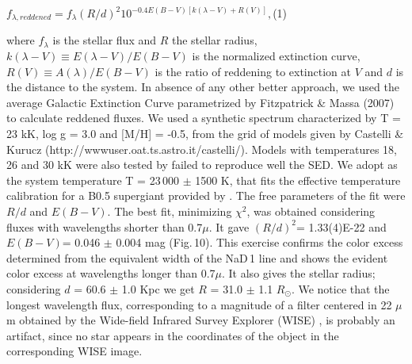 \documentclass[useAMS,usenatbib]{mn2e}
\def\rsun{$R_{\odot}$}
\begin{document}
\begin{small}
$f_{\lambda , reddened}=  f_{\lambda} (R/d)^2  10^{-0.4E(B-V)[k(\lambda -V)+R(V)]}, $\hfill(1)\\
\end{small}
 
\noindent  
where  $f_{\lambda}$ is the stellar flux and $R$ the stellar radius,  $k(\lambda-V) \equiv E(\lambda-V)/E(B-V)$ is the normalized extinction
curve, $R(V) \equiv A(\lambda)/E(B-V)$ is the ratio of reddening to extinction at $V$ and $d$ is the distance to the system. In absence of any other better approach, we used the average Galactic Extinction Curve parametrized by Fitzpatrick \& Massa (2007) to calculate reddened fluxes. 
We used a synthetic spectrum characterized by T = 23 kK, log g = 3.0 and [M/H] = -0.5, from the grid of models given by Castelli \& Kurucz (http://wwwuser.oat.ts.astro.it/castelli/). Models with temperatures 18, 26 and 30 kK were also tested by failed to reproduce well the SED. We adopt as the system temperature T = 23\,000 $\pm$ 1500 K, that
 fits the effective temperature calibration for a B0.5 supergiant provided by \citet{2007A&A...463.1093L}.
The free parameters of the fit were $R/d$ and $E(B-V)$. 
The best fit, minimizing $\chi^{2}$,  was obtained considering fluxes with wavelengths shorter than 0.7$\mu$. It gave $(R/d)^2$= 1.33(4)E-22  and  $E(B-V)$= 0.046 $\pm$ 0.004  mag (Fig.\,10). This exercise confirms the color excess determined from the equivalent width of the NaD\,1 line and shows the evident color excess at wavelengths longer than 0.7$\mu$. It also gives the stellar radius; considering $d$ = 60.6 $\pm$ 1.0 Kpc \citep[][]{2005MNRAS.357..304H} we get  $R$ = 31.0 $\pm$ 1.1 \rsun. We notice that the longest wavelength 
flux, corresponding to a magnitude of a filter centered in 22 $\mu$m obtained by the Wide-field Infrared Survey Explorer (WISE) \citep{2010AJ....140.1868W}, is probably an artifact, since no star appears in the coordinates of the object in the corresponding WISE image. 
\end{document}
